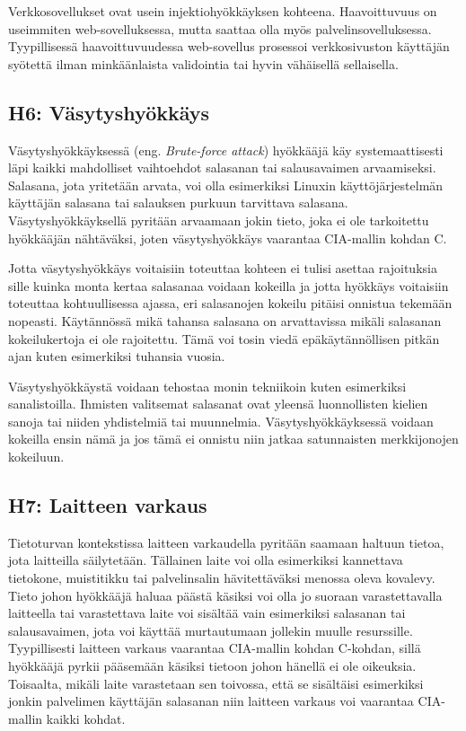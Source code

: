Verkkosovellukset ovat usein injektiohyökkäyksen kohteena. Haavoittuvuus on useimmiten web-sovelluksessa, mutta saattaa olla myös palvelinsovelluksessa. Tyypillisessä haavoittuvuudessa web-sovellus prosessoi verkkosivuston käyttäjän syötettä ilman minkäänlaista validointia tai hyvin vähäisellä sellaisella.~\cite{mcdonald2020web}

\subsection{H6: Väsytyshyökkäys}
Väsytyshyökkäyksessä (eng. \textit{Brute-force attack}) hyökkääjä käy systemaattisesti läpi kaikki mahdolliset vaihtoehdot salasanan tai salausavaimen arvaamiseksi. Salasana, jota yritetään arvata, voi olla esimerkiksi Linuxin käyttöjärjestelmän käyttäjän salasana tai salauksen purkuun tarvittava salasana. Väsytyshyökkäyksellä pyritään arvaamaan jokin tieto, joka ei ole tarkoitettu hyökkääjän nähtäväksi, joten väsytyshyökkäys vaarantaa CIA-mallin kohdan C.

Jotta väsytyshyökkäys voitaisiin toteuttaa kohteen ei tulisi asettaa rajoituksia sille kuinka monta kertaa salasanaa voidaan kokeilla ja jotta hyökkäys voitaisiin toteuttaa kohtuullisessa ajassa, eri salasanojen kokeilu pitäisi onnistua tekemään nopeasti. Käytännössä mikä tahansa salasana on arvattavissa mikäli salasanan kokeilukertoja ei ole rajoitettu. Tämä voi tosin viedä epäkäytännöllisen pitkän ajan kuten esimerkiksi tuhansia vuosia.

Väsytyshyökkäystä voidaan tehostaa monin tekniikoin kuten esimerkiksi sanalistoilla. Ihmisten valitsemat salasanat ovat yleensä luonnollisten kielien sanoja tai niiden yhdistelmiä tai muunnelmia. Väsytyshyökkäyksessä voidaan kokeilla ensin nämä ja jos tämä ei onnistu niin jatkaa satunnaisten merkkijonojen kokeiluun.~\cite{beaver2015hacking}

\subsection{H7: Laitteen varkaus}
Tietoturvan kontekstissa laitteen varkaudella pyritään saamaan haltuun tietoa, jota laitteilla säilytetään. Tällainen laite voi olla esimerkiksi kannettava tietokone, muistitikku tai palvelinsalin hävitettäväksi menossa oleva kovalevy. Tieto johon hyökkääjä haluaa päästä käsiksi voi olla jo suoraan varastettavalla laitteella tai varastettava laite voi sisältää vain esimerkiksi salasanan tai salausavaimen, jota voi käyttää murtautumaan jollekin muulle resurssille. Tyypillisesti laitteen varkaus vaarantaa CIA-mallin kohdan C-kohdan, sillä hyökkääjä pyrkii pääsemään käsiksi tietoon johon hänellä ei ole oikeuksia. Toisaalta, mikäli laite varastetaan sen toivossa, että se sisältäisi esimerkiksi jonkin palvelimen käyttäjän salasanan niin laitteen varkaus voi vaarantaa CIA-mallin kaikki kohdat.~\cite{beaver2015hacking}
